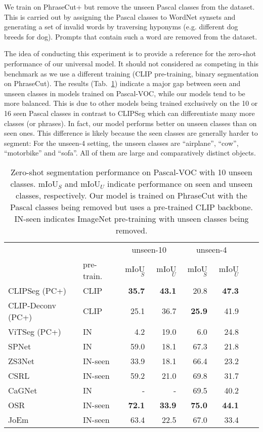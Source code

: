We train on PhraseCut+ but remove the unseen Pascal classes from the dataset. This is carried out by assigning the Pascal classes to WordNet synsets \cite{wordnet} and generating a set of invalid words by traversing hyponyms (e.g. different dog breeds for dog). Prompts that contain such a word are removed from the dataset.

The idea of conducting this experiment is to provide a reference for the zero-shot performance of our universal model. It should not considered as competing in this benchmark as we use a different training (CLIP pre-training, binary segmentation on PhraseCut).
The results (Tab.~\ref{tab:zero_shot_performance}) indicate a major gap between seen and unseen classes in models trained on Pascal-VOC, while our models tend to be more balanced. This is due to other models being trained exclusively on the 10 or 16 seen Pascal classes in contrast to CLIPSeg which can differentiate many more classes (or phrases). 
In fact, our model performs better on unseen classes than on seen ones. This difference is likely because the seen classes are generally harder to segment: For the unseen-4 setting, the unseen classes are ``airplane'', ``cow'', ``motorbike'' and ``sofa''. All of them are large and comparatively distinct objects.

\begin{table}[]
    \centering
    \footnotesize
    \setlength{\tabcolsep}{1.5mm}
    \begin{tabular}{ll|rr|rrll}
         \toprule
         && \multicolumn{2}{c|}{unseen-10} & \multicolumn{2}{c}{unseen-4} \\
        & pre-train. & mIoU$_S$ & mIoU$_U$ & mIoU$_S$ & mIoU$_U$  \\
        \midrule
CLIPSeg (PC+) & CLIP &  \textbf{35.7} & \textbf{43.1} & 20.8 & \textbf{47.3} \\
CLIP-Deconv (PC+) & CLIP &  25.1 & 36.7 & \textbf{25.9} & 41.9 \\
ViTSeg (PC+) & IN &  4.2 & 19.0 & 6.0 & 24.8 \\
        \midrule
        \midrule
        SPNet \cite{xian19} & IN & 59.0 & 18.1 & 67.3 & 21.8 \\
        ZS3Net \cite{bucher19} & IN-seen & 33.9 & 18.1 & 66.4 & 23.2 \\
        CSRL \cite{li20consistent}  & IN-seen  & 59.2 & 21.0 & 69.8 & 31.7  \\
        CaGNet \cite{gu2020context} & IN & - & - & 69.5 & 40.2 \\
        OSR \cite{zhang21} & IN-seen &  \textbf{72.1} & \textbf{33.9} & \textbf{75.0} & \textbf{44.1} \\
        JoEm \cite{baek21} & IN-seen & 63.4 & 22.5 & 67.0 & 33.4  \\
        \bottomrule
    \end{tabular}%
    \caption{Zero-shot segmentation performance on Pascal-VOC with 10 unseen classes. mIoU$_S$ and mIoU$_U$ indicate performance on seen and unseen classes, respectively. Our model is trained on PhraseCut with the Pascal classes being removed but uses a pre-trained CLIP backbone. IN-seen indicates ImageNet pre-training with unseen classes being removed.}
    \label{tab:zero_shot_performance}
\end{table}

